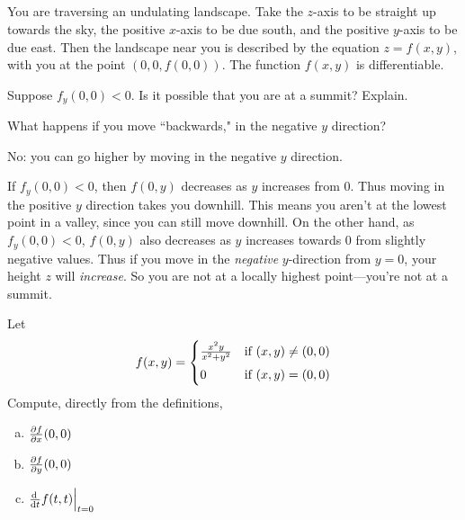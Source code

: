 


\subsection*{\Conceptual}

\begin{question}
You are traversing an undulating landscape. Take the $z$-axis to be straight up towards the sky, the positive $x$-axis to be due south, and the positive $y$-axis to be due east. Then the landscape near you is described by the equation $z=f(x,y)$, with you at the point $(0,0,f(0,0))$. The function $f(x,y)$ is differentiable.

Suppose $f_y(0,0)<0$. Is it possible that you are at a summit? Explain.

\end{question}
\begin{hint}
What happens if you move ``backwards," in the negative $y$ direction?
\end{hint}
\begin{answer}
No: you can go higher by moving in the negative $y$ direction.
\end{answer}
\begin{solution}

If $f_y(0,0)<0$, then $f(0,y)$ decreases as $y$ increases from $0$.
Thus moving in the positive $y$ direction takes you downhill. This means 
you aren't at the lowest point in a valley, since you can still move downhill.
On the other hand, as $f_y(0,0)<0$, $f(0,y)$ also decreases as $y$ 
increases towards $0$ from slightly negative values. Thus if you move in the \emph{negative} $y$-direction from $y=0$, your height $z$ will \emph{increase}. 
So you are not at a locally highest point---you're not at a summit.

\end{solution}

\begin{question}[M226 2009D] %
Let
\begin{equation*}
f(x,y)=\begin{cases}\frac{x^2y}{x^2+y^2}& \text{if $(x,y)\ne (0,0)$} \\
                \noalign{\vskip0.05in}
                0 & \text{if $(x,y)=(0,0)$}
       \end{cases}
\end{equation*}
Compute, directly from the definitions,
\begin{enumerate}[(a)]
\item
$\pdiff{f}{x}(0,0)$ 
\item
$\pdiff{f}{y}(0,0)$
\item
$\diff{}{t} f(t,t)\Big|_{t=0}$
\end{enumerate}
\end{question}

